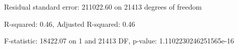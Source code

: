 Residual standard error: 211022.60 on 21413 degrees of freedom

R-squared: 0.46, Adjusted R-squared: 0.46

F-statistic: 18422.07 on 1 and 21413 DF, p-value: 1.1102230246251565e-16

